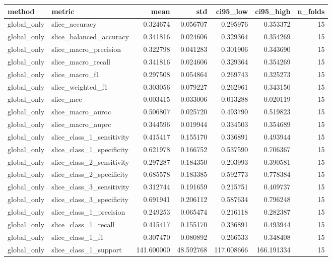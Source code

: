 \begin{tabular}{llrrrrr}
\toprule
method & metric & mean & std & ci95_low & ci95_high & n_folds \\
\midrule
global_only & slice_accuracy & 0.324674 & 0.056707 & 0.295976 & 0.353372 & 15 \\
global_only & slice_balanced_accuracy & 0.341816 & 0.024606 & 0.329364 & 0.354269 & 15 \\
global_only & slice_macro_precision & 0.322798 & 0.041283 & 0.301906 & 0.343690 & 15 \\
global_only & slice_macro_recall & 0.341816 & 0.024606 & 0.329364 & 0.354269 & 15 \\
global_only & slice_macro_f1 & 0.297508 & 0.054864 & 0.269743 & 0.325273 & 15 \\
global_only & slice_weighted_f1 & 0.303056 & 0.079227 & 0.262961 & 0.343150 & 15 \\
global_only & slice_mcc & 0.003415 & 0.033006 & -0.013288 & 0.020119 & 15 \\
global_only & slice_macro_auroc & 0.506807 & 0.025720 & 0.493790 & 0.519823 & 15 \\
global_only & slice_macro_auprc & 0.344596 & 0.019944 & 0.334503 & 0.354689 & 15 \\
global_only & slice_class_1_sensitivity & 0.415417 & 0.155170 & 0.336891 & 0.493944 & 15 \\
global_only & slice_class_1_specificity & 0.621978 & 0.166752 & 0.537590 & 0.706367 & 15 \\
global_only & slice_class_2_sensitivity & 0.297287 & 0.184350 & 0.203993 & 0.390581 & 15 \\
global_only & slice_class_2_specificity & 0.685578 & 0.183385 & 0.592773 & 0.778384 & 15 \\
global_only & slice_class_3_sensitivity & 0.312744 & 0.191659 & 0.215751 & 0.409737 & 15 \\
global_only & slice_class_3_specificity & 0.691941 & 0.206112 & 0.587634 & 0.796248 & 15 \\
global_only & slice_class_1_precision & 0.249253 & 0.065474 & 0.216118 & 0.282387 & 15 \\
global_only & slice_class_1_recall & 0.415417 & 0.155170 & 0.336891 & 0.493944 & 15 \\
global_only & slice_class_1_f1 & 0.307470 & 0.080892 & 0.266533 & 0.348408 & 15 \\
global_only & slice_class_1_support & 141.600000 & 48.592768 & 117.008666 & 166.191334 & 15 \\

\end{tabular}
